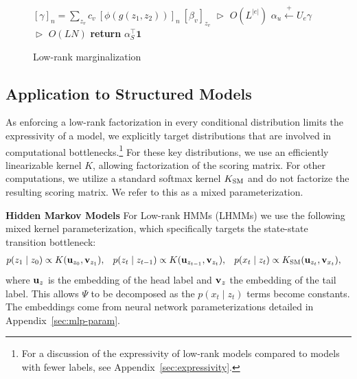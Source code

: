 \documentclass{article}
\begin{document}
\begin{figure}
\begin{minipage}{0.55\textwidth}
\begin{algorithm}[H]
\caption{\label{alg:low-rank-update} Low-rank marginalization}
\begin{algorithmic} 
\STATE \hspace*{-0.2cm}$[\gamma]_n = \displaystyle \sum_{z_v} c_v\  [\phi(g(z_{1}, z_{2}))]_n \  [\beta_{v}]_{z_v}$
\hfill $\vartriangleright$ $O(L^{|e|})$
\ENDFOR
\STATE $\alpha_u \stackrel{+}{\gets} U_e\gamma $
    \hfill $\vartriangleright$ $O(LN)$
\ENDFOR
\STATE \textbf{return} $\alpha_S^\top\mathbf{1}$
\end{algorithmic} 
\end{algorithm}
\end{minipage}
\end{figure}

\subsection{Application to Structured Models}
As enforcing a low-rank factorization in every conditional distribution limits the expressivity of a model,
we explicitly target distributions that are involved in computational bottlenecks.\footnote{For a discussion of the expressivity of low-rank models compared to models with fewer labels, see Appendix~\ref{sec:expressivity}.}
For these key distributions, we use an efficiently linearizable kernel $K$, allowing factorization of the scoring matrix.
For other computations, we utilize a standard softmax kernel $K_{\mathrm{SM}}$ and do not factorize the resulting scoring matrix.
We refer to this as a mixed parameterization.

\textbf{Hidden Markov Models}
For Low-rank HMMs (LHMMs) we use the following mixed kernel parameterization, which specifically targets the state-state transition bottleneck:
\begin{equation}
\begin{aligned}
p(z_1 \mid z_0) &\propto K(\mathbf{u}_{z_0}, \mathbf{v}_{z_1}),&
p(z_t \mid z_{t-1}) &\propto K(\mathbf{u}_{z_{t-1}}, \mathbf{v}_{z_t}),&
p(x_t \mid z_t) &\propto K_{\mathrm{SM}}(\mathbf{u}_{z_t}, \mathbf{v}_{x_t}),
\end{aligned}
\end{equation}
where $\mathbf{u}_{z}$ is the embedding of the head label and $\mathbf{v}_{z}$
the embedding of the tail label. 
This allows $\Psi$ to be decomposed as the $p(x_t\mid z_t)$ terms become constants.
The embeddings come from neural network parameterizations detailed in Appendix~\ref{sec:mlp-param}.
\end{document}
